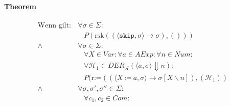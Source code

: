 																\paragraph{Theorem}
																	\begin{align*}
																		\text{Wenn gilt:} & \,\forall \sigma \in \Sigma :                                                                                                                                                                                              \\
																		                  & \quad P(\text{rsk}((\langle \texttt{skip}, \sigma \rangle \rightarrow \sigma), ()))                                                                                                                                        \\
																		\land             & \,\forall \sigma \in \Sigma :                                                                                                                                                                                              \\
																		                  & \quad \forall X \in \textit{Var} : \forall a \in \textit{AExp} : \forall n \in \textit{Num} :                                                                                                                              \\
																		                  & \quad \forall \mathcal{H} _ 1 \in \textit{DER} _ \mathcal{A} (\langle a, \sigma \rangle \Downarrow n) :                                                                                                                    \\
																		                  & \quad P(\text{r:=}((\langle X \coloneqq a, \sigma \rangle \rightarrow \sigma[X \backslash n]), (\mathcal{H} _ 1))                                                                                                          \\
																		\land             & \,\forall \sigma, \sigma', \sigma'' \in \Sigma :                                                                                                                                                                           \\
																		                  & \quad \forall c _ 1, c _ 2 \in \textit{Com} :                                                                                                                                                                              \\

\end{align*}
